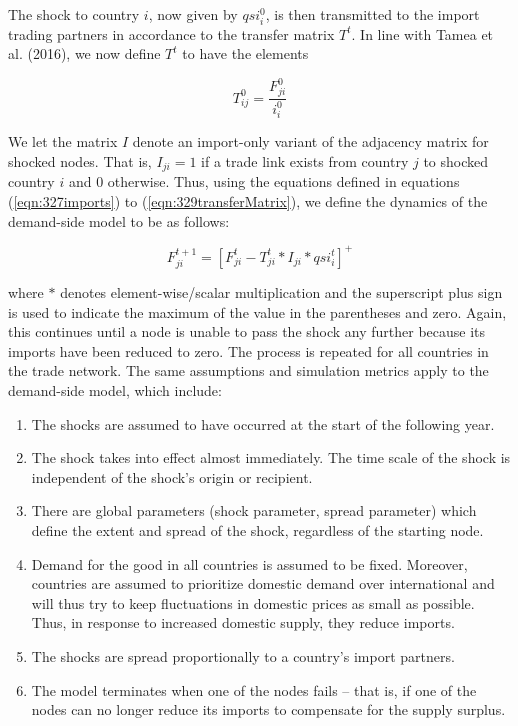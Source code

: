 \documentclass[12pt,letterpaper]{report}
\begin{document}
	The shock to country $i$, now given by $qsi_{i}^{0}$, is then transmitted to the import trading partners in accordance to the transfer matrix $T^{t}$. In line with Tamea et al. (2016),  we now define $T^{t}$ to have the elements 
	
	\begin{equation}
	\label{eqn:329transferMatrix} T_{ij}^{0} = \frac{F_{ji}^{0}}{i_{i}^{0}}
	\end{equation}
	
	We let the matrix $I$ denote an import-only variant of the adjacency matrix for shocked nodes. That is, $I_{ji}= 1$  if a trade link exists from country $j$ to shocked country $i$ and 0 otherwise. Thus, using the equations defined in equations (\ref{eqn:327imports}) to (\ref{eqn:329transferMatrix}), we define the dynamics of the demand-side model to be as follows:
	
	\begin{equation}
	\label{eqn:330dynamics} F_{ji}^{t + 1} = 
	\left[
	F_{ji}^{t} - T_{ji}^{t} * I_{ji} * qsi_{i}^{t}
	\right]^{+}
	\end{equation}
	
	where $*$ denotes element-wise/scalar multiplication and the superscript plus sign is used to indicate the maximum of the value in the parentheses and zero. Again, this continues until a node is unable to pass the shock any further because its imports have been reduced to zero. The process is repeated for all countries in the trade network. The same assumptions and simulation metrics apply to the demand-side model, which include:
	
	\begin{enumerate}
		\item The shocks are assumed to have occurred at the start of the following year.
		\item The shock takes into effect almost immediately. The time scale of the shock is independent of the shock's origin or recipient.
		\item There are global parameters (shock parameter, spread parameter) which define the extent and spread of the shock, regardless of the starting node.
		\item Demand for the good in all countries is assumed to be fixed. Moreover, countries are assumed to prioritize domestic demand over international and will thus try to keep fluctuations in domestic prices as small as possible. Thus, in response to increased domestic supply, they reduce imports.
		\item The shocks are spread proportionally to a country's import partners.  
		\item The model terminates when one of the nodes fails – that is, if one of the nodes can no longer reduce its imports to compensate for the supply surplus.  
	\end{enumerate}
	
\end{document}
